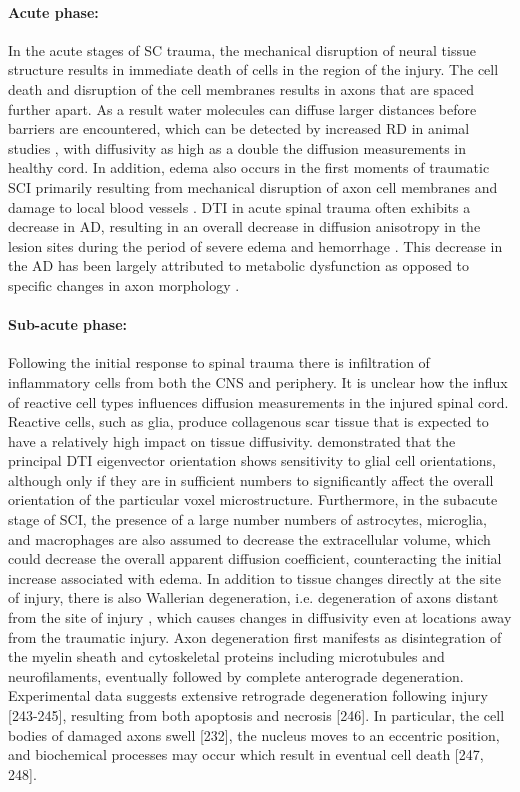 \paragraph{Acute phase: }
In the acute stages of SC trauma, the mechanical disruption of neural tissue structure results in immediate death of cells in the region of the injury. The cell death and disruption of the cell membranes results in axons that are spaced further apart. As a result water molecules can diffuse larger distances before barriers are encountered, which can be detected by increased \gls{RD} in animal studies \citep{207, 208}, with diffusivity as high as a double the diffusion measurements in healthy cord. In addition, edema also occurs in the first moments of traumatic \gls{SCI} primarily resulting from mechanical disruption of axon cell membranes and damage to local blood vessels \citep{232, 233}.  \Gls{DTI} in acute spinal trauma often exhibits a decrease in \gls{AD}, resulting in an overall decrease in diffusion anisotropy in the lesion sites during the period of severe edema and hemorrhage \citep{207}.  This decrease in the \gls{AD} has been largely attributed to metabolic dysfunction as opposed to specific changes in axon morphology \citep{234}. 
%
%
\paragraph{Sub-acute phase: }
Following the initial response to spinal trauma there is infiltration of inflammatory cells from both the CNS and periphery.  It is unclear how the influx of reactive cell types influences diffusion measurements in the injured spinal cord.  Reactive cells, such as glia, produce collagenous scar tissue that is expected to have a relatively high impact on tissue diffusivity.   demonstrated that  the principal DTI eigenvector orientation shows sensitivity to glial cell orientations, although only if they are in sufficient numbers to significantly affect the overall orientation of the particular voxel microstructure.  Furthermore, in the subacute stage of SCI, the presence of a large number numbers of astrocytes, microglia, and macrophages are also assumed to decrease the extracellular volume, which could decrease the overall apparent diffusion coefficient, counteracting the initial increase associated with edema.
%
%
% 
In addition to tissue changes directly at the site of injury,  there is also Wallerian degeneration, i.e. degeneration of axons distant from the site of injury \citep{241}, which causes changes in diffusivity even at locations away from the traumatic injury.  Axon degeneration first manifests as disintegration of the myelin sheath and cytoskeletal proteins including microtubules and neurofilaments, eventually followed by  complete anterograde degeneration. Experimental data suggests extensive retrograde degeneration following injury [243-245], resulting from both apoptosis and necrosis [246].  In particular, the cell bodies of damaged axons swell [232], the nucleus moves to an eccentric position, and biochemical processes may occur which result in eventual cell death [247, 248].  


